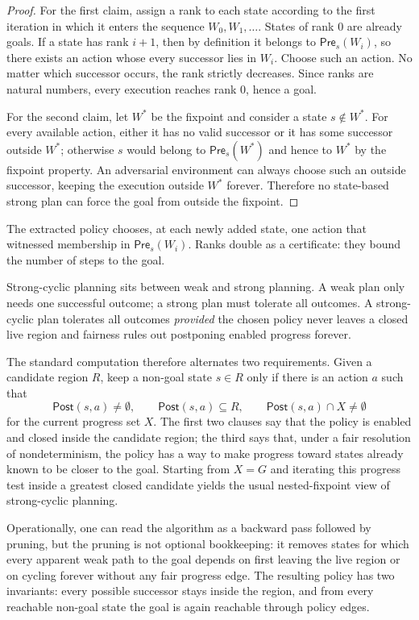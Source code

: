 \begin{proof}
For the first claim, assign a rank to each state according to the first
iteration in which it enters the sequence $W_0,W_1,\ldots$.  States of
rank $0$ are already goals.  If a state has rank $i+1$, then by
definition it belongs to $\mathsf{Pre}_s(W_i)$, so there exists an
action whose every successor lies in $W_i$.  Choose such an action.  No
matter which successor occurs, the rank strictly decreases.  Since ranks
are natural numbers, every execution reaches rank $0$, hence a goal.

For the second claim, let $W^\ast$ be the fixpoint and consider a state
$s\notin W^\ast$.  For every available action, either it has no valid
successor or it has some successor outside $W^\ast$; otherwise $s$
would belong to $\mathsf{Pre}_s(W^\ast)$ and hence to $W^\ast$ by the
fixpoint property.  An adversarial environment can always choose such
an outside successor, keeping the execution outside $W^\ast$ forever.
Therefore no state-based strong plan can force the goal from outside
the fixpoint.
\end{proof}

The extracted policy chooses, at each newly added state, one action
that witnessed membership in $\mathsf{Pre}_s(W_i)$.  Ranks double as a
certificate: they bound the number of steps to the goal.

\begin{formaldetails}
Strong-cyclic planning sits between weak and strong planning.  A weak
plan only needs one successful outcome; a strong plan must tolerate all
outcomes.  A strong-cyclic plan tolerates all outcomes \emph{provided}
the chosen policy never leaves a closed live region and fairness rules
out postponing enabled progress forever.

The standard computation therefore alternates two requirements.  Given
a candidate region $R$, keep a non-goal state $s\in R$ only if there is
an action $a$ such that
\[
  \mathsf{Post}(s,a)\neq\emptyset,\qquad
  \mathsf{Post}(s,a)\subseteq R,\qquad
  \mathsf{Post}(s,a)\cap X\neq\emptyset
\]
for the current progress set $X$.  The first two clauses say that the
policy is enabled and closed inside the candidate region; the third says
that, under a fair resolution of nondeterminism, the policy has a way to
make progress toward states already known to be closer to the goal.
Starting from $X=G$ and iterating this progress test inside a greatest
closed candidate yields the usual nested-fixpoint view of
strong-cyclic planning.

Operationally, one can read the algorithm as a backward pass followed by
pruning, but the pruning is not optional bookkeeping: it removes states
for which every apparent weak path to the goal depends on first leaving
the live region or on cycling forever without any fair progress edge.
The resulting policy has two invariants: every possible successor stays
inside the region, and from every reachable non-goal state the goal is
again reachable through policy edges.
\end{formaldetails}

